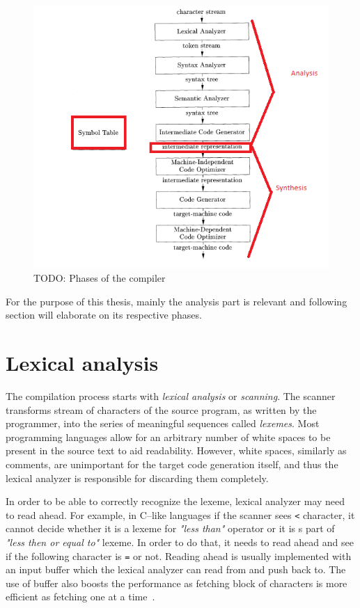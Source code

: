 \documentclass[
  digital, %
  table,   %
  lof,     %
  lot,     %
  oneside,
]{fithesis3}
\begin{document}
\begin{figure}[h!]
		\centering
			\includegraphics[scale=0.75]{img/compiler-phases}
		\caption{TODO: Phases of the compiler~\cite{dragon-book}}
		\label{fig:compiler-phases}
\end{figure}

For the purpose of this thesis, mainly the analysis part is relevant and following section will elaborate on its respective phases.

  \section{Lexical analysis}
The compilation process starts with \textit{lexical analysis} or \textit{scanning}. The scanner transforms stream of characters of the source program, as written by the programmer, into the series of meaningful sequences called \textit{lexemes}. Most programming languages allow for an arbitrary number of white spaces to be present in the source text to aid readability. However, white spaces, similarly as comments, are unimportant for the target code generation itself, and thus the lexical analyzer is responsible for discarding them completely.

In order to be able to correctly recognize the lexeme, lexical analyzer may need to read ahead. For example, in C--like languages if the scanner sees \texttt{<} character, it cannot decide whether it is a lexeme for \textit{"less than"} operator or it is s part of \textit{"less then or equal to"} lexeme. In order to do that, it needs to read ahead and see if the following character is \texttt{=} or not. Reading ahead is usually implemented with an input buffer which the lexical analyzer can read from and push back to. The use of buffer also boosts the performance as fetching block of characters is more efficient as fetching one at a time~\cite{dragon-book}.
\end{document}
